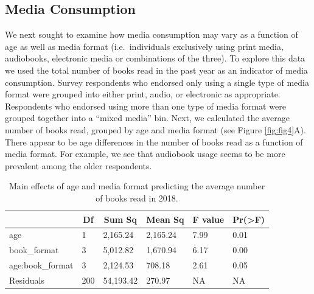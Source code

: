 \documentclass[man, fleqn, noextraspace]{apa6}
\theoremstyle{definition}
\theoremstyle{definition}
\theoremstyle{definition}
\theoremstyle{remark}
\begin{document}
\subsection{Media Consumption}\label{media-consumption}

We next sought to examine how media consumption may vary as a function
of age as well as media format (i.e.~individuals exclusively using print
media, audiobooks, electronic media or combinations of the three). To
explore this data we used the total number of books read in the past
year as an indicator of media consumption. Survey respondents who
endorsed only using a single type of media format were grouped into
either print, audio, or electronic as appropriate. Respondents who
endorsed using more than one type of media format were grouped together
into a \enquote{mixed media} bin. Next, we calculated the average number
of books read, grouped by age and media format (see Figure
\ref{fig:fig4}A). There appear to be age differences in the number of
books read as a function of media format. For example, we see that
audiobook usage seems to be more prevalent among the older respondents.

\begin{table}[tbp]
\begin{center}
\begin{threeparttable}
\caption{\label{tab:tab2}Main effects of age and media format predicting the average number of books read in 2018.}
\begin{tabular}{llllll}
\toprule
 & \multicolumn{1}{c}{Df} & \multicolumn{1}{c}{Sum Sq} & \multicolumn{1}{c}{Mean Sq} & \multicolumn{1}{c}{F value} & \multicolumn{1}{c}{Pr(>F)}\\
\midrule
age & 1 & 2,165.24 & 2,165.24 & 7.99 & 0.01\\
book\_format & 3 & 5,012.82 & 1,670.94 & 6.17 & 0.00\\
age:book\_format & 3 & 2,124.53 & 708.18 & 2.61 & 0.05\\
Residuals & 200 & 54,193.42 & 270.97 & NA & NA\\
\bottomrule
\end{tabular}
\end{threeparttable}
\end{center}
\end{table}
\end{document}
